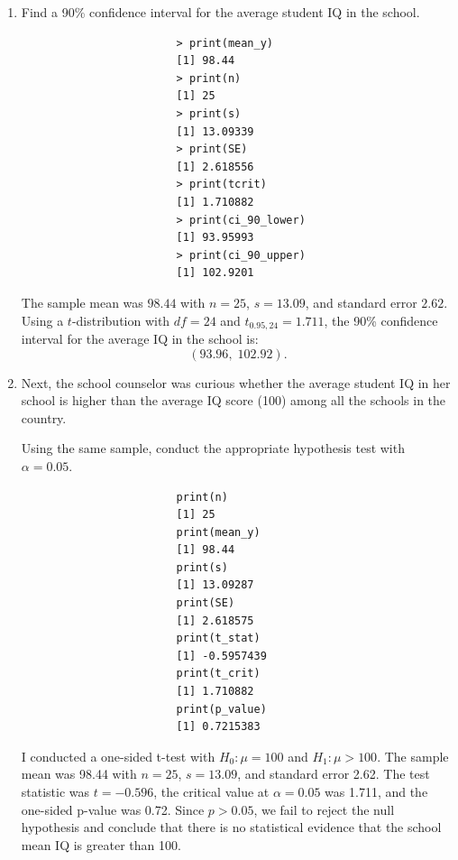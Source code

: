 \documentclass[12pt,letterpaper]{article}
\begin{document}
				\begin{enumerate}
					\item Find a 90\% confidence interval for the average student IQ in the school.
					
					
					
					\vspace{.25cm}
					
					  \begin{verbatim}
						> print(mean_y)
						[1] 98.44
						> print(n)
						[1] 25
						> print(s)
						[1] 13.09339
						> print(SE)
						[1] 2.618556
						> print(tcrit)
						[1] 1.710882
						> print(ci_90_lower)
						[1] 93.95993
						> print(ci_90_upper)
						[1] 102.9201
					\end{verbatim}
					
					 \vspace{.25cm}
					   \noindent The sample mean was $98.44$ with $n=25$, $s=13.09$, and standard error $2.62$.
					 Using a $t$-distribution with $df=24$ and $t_{0.95,24}=1.711$, the 90\% confidence interval 
					 for the average IQ in the school is:
					 \[
					 (93.96,\; 102.92).
					 \]
				
					\item Next, the school counselor was curious  whether  the average student IQ in her school is higher than the average IQ score (100) among all the schools in the country.
					
					\noindent Using the same sample, conduct the appropriate hypothesis test with $\alpha=0.05$.
					
					
					
						\begin{verbatim}
						print(n)
						[1] 25
						print(mean_y)
						[1] 98.44
						print(s)
						[1] 13.09287
						print(SE)
						[1] 2.618575
						print(t_stat)
						[1] -0.5957439
						print(t_crit)
						[1] 1.710882
						print(p_value)
						[1] 0.7215383
						\end{verbatim}
				
					\noindent I conducted a one-sided t-test with $H_0:\mu=100$ and $H_1:\mu>100$. The sample mean was 98.44 with $n=25$, $s=13.09$, and standard error 2.62. The test statistic was $t=-0.596$, the critical value at $\alpha=0.05$ was 1.711, and the one-sided p-value was 0.72. Since $p > 0.05$, we fail to reject the null hypothesis and conclude that there is no statistical evidence that the school mean IQ is greater than 100.
					

\end{enumerate}
\end{document}
